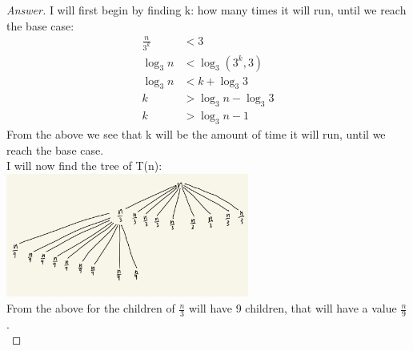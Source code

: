 \documentclass[11pt]{article}
\theoremstyle{definition}
\theoremstyle{definition}
\theoremstyle{definition}
\begin{document}
\begin{proof}[Answer]
I will first begin by finding k: how many times it will run, until we reach the base case: \\
\begin{align*}
\frac{n}{3^k}  &< 3\\
\log_3 n &< \log_3 (3^k, 3) \\
\log_3 n&< k + \log_3 3 \\
k &> \log_3 n - \log_3 3  \\
k &> \log_3 n - 1
\end{align*}
From the above we see that k will be the amount of time it will run, until we reach the base case.\\

I will now find the tree of T(n): \\
\includegraphics[width=0.6\textwidth]{IMG_F40695BF3954-1.jpeg}\\
From the above for the children of $\frac{n}{3}$ will have 9 children, that will have a value $\frac{n}{9}$. \\


\end{proof}
\end{document}
